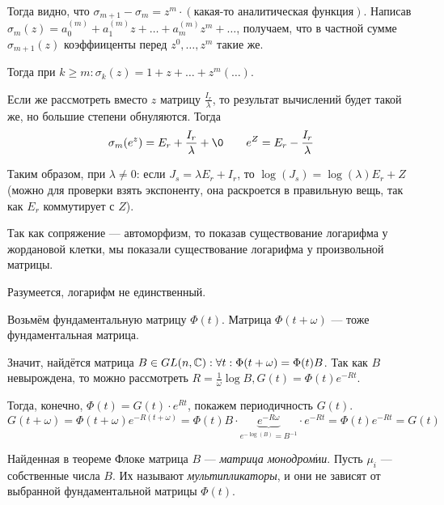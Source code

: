 \documentclass[a4paper]{report}
\begin{document}
{{{{{Тогда видно, что $\sigma_{m + 1} - \sigma_m = z^m\cdot (\text{какая-то аналитическая функция})$.
Написав $\sigma_m(z) = a_0^{(m)} + a_1^{(m)}z + \dots + a_m^{(m)}z^m + \dots$, получаем, что в частной сумме $\sigma_{m + 1}(z)$ коэффииценты перед $z^0, \dots, z^m$ такие же.

Тогда при $k \ge m: \sigma_k(z) = 1 + z + \dots + z^m(\dots)$.

    Если же рассмотреть вместо $z$ матрицу $\frac{I_r}{\lambda}$, то результат вычислений будет такой же, но большие степени обнуляются.
        Тогда \[\sigma_m(e^z) = E_r + \frac{I_r}{\lambda} + \0\qquad e^Z = E_r - \frac{I_r}{\lambda}\]
    }

Таким образом, при $\lambda \ne 0$: если $J_s = \lambda E_r + I_r$, то $\log(J_s) = \log(\lambda) E_r + Z$ (можно для проверки взять экспоненту, она раскроется в правильную вещь, так как $E_r$ коммутирует с $Z$).

    Так как сопряжение --- автоморфизм, то показав существование логарифма у жордановой клетки, мы показали существование логарифма у произвольной матрицы.

Разумеется, логарифм не единственный.
}
}
    Возьмём фундаментальную матрицу $\Phi(t)$.
        Матрица $\Phi(t + \omega)$ --- тоже фундаментальная матрица.

    Значит, найдётся матрица $B \in GL(n, \mathbb{C}): \forall t: \Phi(t + \omega) = \Phi(t)B$.
        Так как $B$ невырождена, то можно рассмотреть $R = \frac{1}{\omega}\log B, G(t) = \Phi(t)e^{-Rt}$.

    Тогда, конечно, $\Phi(t) = G(t) \cdot e^{Rt}$, покажем периодичность $G(t)$.
    \[G(t + \omega) = \Phi(t + \omega)e^{-R(t + \omega)} = \Phi(t)B \cdot \underbrace{e^{-R\omega}}_{e^{-\log(B)} = B^{-1}} \cdot e^{-R t} = \Phi(t)e^{-Rt} = G(t)\]
    }
    }
    \provehere{
    }
    Найденная в теореме Флоке матрица $B$ --- \emph{матрица монодром$\acute{\text{и}}$и}.
    Пусть $\mu_i$ --- собственные числа $B$.
    Их называют \emph{мультипликаторы}, и они не зависят от выбранной фундаментальной матрицы $\Phi(t)$.
\end{document}

